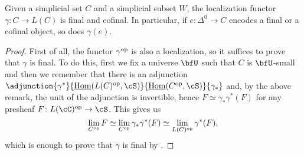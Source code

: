 \begin{prop}\label{7110}
  Given a simplicial set $C$ and a simplicial subset $W$, the localization
  functor $\gamma\colon C\rightarrow L(C)$ is final and cofinal. In
  particular, if $e\colon\Delta^0\rightarrow C$ encodes a final or a cofinal
  object, so does $\gamma(e)$.
\end{prop}
\begin{proof}
  First of all, the functor $\gamma^{\operatorname{op}}$ is also a localization, so it
  suffices to prove that $\gamma$ is final. To do this, first we fix a universe
  $\bfU$ such that $C$ is $\bfU$-small and then we remember that there
  is an adjunction
  $\adjunction{\gamma^*}{\home(L(C)^{\op},\cS)}{\home(C^{\op},\cS)}{\gamma_*}$
  and, by the above remark, the unit of the adjunction is invertible, hence
  $F\simeq\gamma_*\gamma^*(F)$ for any presheaf $F\colon
  L(\cC)^{\op}\rightarrow\cS$. This gives us
  \[\lim_{C^{\operatorname{op}}}F\simeq
  \lim_{C^{\operatorname{op}}}\gamma_*\gamma^*(F)\simeq
  \lim_{L(C)^{\operatorname{op}}}\gamma^*(F),\]
  which is enough to prove that $\gamma$ is final by \cite[Thm.\ 6.4.5]{Cis19}.
\end{proof}

